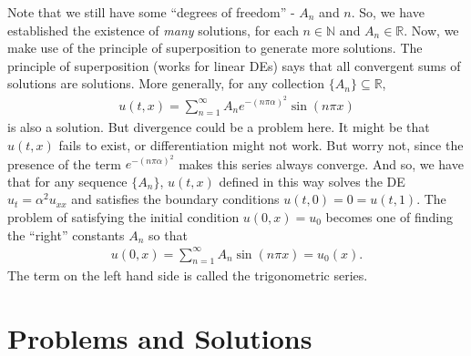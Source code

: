 \documentclass{article}
\theoremstyle{definition}
\newcommand{\R}{\mathbb{R}}
\begin{document}
Note that we still have some ``degrees of freedom'' - $A_n$ and $n$. So, we have established the existence of \textit{many} solutions, for each $n\in\mathbb{N}$ and $A_n\in\R$. Now, we make use of the principle of superposition to generate more solutions. The principle of superposition (works for linear DEs) says that all convergent sums of solutions are solutions. More generally, for any collection $\{A_n \} \subseteq\R$,
\begin{align*}
u(t,x) = \sum_{n=1}^\infty A_n e^{-(n\pi\alpha)^2}\sin(n\pi x)
\end{align*}
is also a solution. But divergence could be a problem here. It might be that $u(t,x)$ fails to exist, or differentiation might not work. But worry not, since the presence of the term $e^{-(n\pi\alpha)^2}$ makes this series always converge. And so, we have that for any sequence $\{ A_n\}$, $u(t,x)$ defined in this way solves the DE $u_t = \alpha^2 u_{xx}$ and satisfies the boundary conditions $u(t,0)=0=u(t,1)$. The problem of satisfying the initial condition $u(0,x) = u_0$ becomes one of finding the ``right'' constants $A_n$ so that 
\begin{align*}
u(0,x) = \sum_{n=1}^\infty A_n\sin(n\pi x) = u_0(x).
\end{align*} 
The term on the left hand side is called the trigonometric series. 































\newpage

\section{Problems and Solutions}
\end{document}
